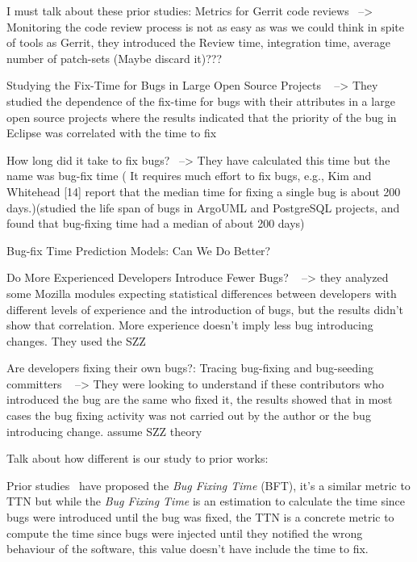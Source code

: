 \documentclass[10pt, conference]{IEEEtran}
\begin{document}
I must talk about these prior studies:
 Metrics for Gerrit code reviews~\cite{lehtonen2015metrics} --> Monitoring the code review process is not as easy as was we could think in spite of tools as Gerrit, they introduced the Review time, integration time, average number of patch-sets (Maybe discard it)???
 
Studying the Fix-Time for Bugs in Large Open Source Projects ~\cite{marks2011studying} --> They studied the dependence of  the fix-time for bugs with their attributes in a large open source projects where the results indicated that the priority of the bug in Eclipse was correlated with the time to fix

How long did it take to fix bugs?~\cite{kim2006long} --> They have calculated this time but the name was bug-fix time ( It requires much effort to fix bugs, e.g., Kim and Whitehead [14] report that the median time for fixing a single bug is about 200 days.)(studied  the  life  span  of  bugs  in  ArgoUML  and  PostgreSQL projects, and found that bug-fixing time had a median of about 200 days)

Bug-fix Time Prediction Models: Can We Do Better? ~\cite{bhattacharya2011bug} 

Do More Experienced Developers Introduce Fewer Bugs? ~\cite{izquierdo2012more} --> they analyzed some Mozilla modules expecting statistical differences between developers with different levels of experience and the introduction of bugs, but the results didn't show that correlation. More experience doesn't imply less bug introducing changes. They used the SZZ

Are developers fixing their own bugs?: Tracing bug-fixing and bug-seeding committers ~\cite{izquierdo2011developers} --> They were looking to understand if these contributors who introduced the bug are the same who fixed it, the results showed that in most cases the bug fixing activity was not carried out by the author or the bug introducing change. assume SZZ theory

Talk about how different is our study to prior works:

Prior studies~\cite{kim2006long} have proposed the \emph{Bug Fixing Time} (BFT), it's a similar metric to TTN but while the \emph{Bug Fixing Time} is an estimation to calculate the time since bugs were introduced until the bug was fixed, the TTN is a concrete metric to compute the time since bugs were injected until they notified the wrong behaviour of the software, this value doesn't have include the time to fix.
\end{document}
